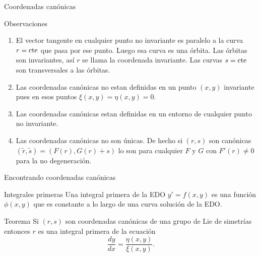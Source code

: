 \documentclass[handout,hyperref={colorlinks=true}]{beamer}
\renewcommand{\emph}[1]{\textcolor[rgb]{1,0,0}{#1}}
\newcommand{\nl}{\onslide<+-> }
\begin{document}
\begin{frame}{Coordenadas canónicas}

\nl \begin{block}{Observaciones}
\begin{enumerate}
\item<+->El vector tangente en cualquier punto no invariante es paralelo a la curva $r=\hbox{cte}$ que pasa por ese punto. Luego esa curva es una órbita. Las órbitas son invariantes, así  $r$ se llama la \emph{coordenada invariante}. Las curvas $s=\hbox{cte}$ son transversales a las órbitas.
\item<+-> Las coordenadas canónicas no estan definidas en un punto $(x,y)$ invariante pues en esos puntos $\xi(x,y)=\eta(x,y)=0$.

\item<+-> Las coordenadas canónicas estan definidas en un entorno de cualquier   punto no invariante.

\item<+-> Las coordenadas canónicas no son únicas. De hecho si $(r,s)$ son canónicas $(\tilde{r},\tilde{s})=(F(r),G(r)+s)$ lo son para cualquier $F$ y $G$ con $F'(r)\neq 0$ para la no degeneración.

\end{enumerate}
\end{block}



\end{frame}


\begin{frame}{Encontrando coordenadas canónicas}

\nl \begin{block}{Integrales primeras}
Una integral primera de la EDO $y'=f(x,y)$ es una función $\phi(x,y)$ que es constante a lo largo de una curva solución de la EDO. 
\end{block}

\nl \begin{block}{Teorema} Si $(r,s)$ son coordenadas canónicas de una grupo de Lie de simetrías entonces $r$ es una integral primera de la ecuación
\begin{equation}\label{eq:int_pri} \frac{dy}{dx}=\frac{\eta(x,y)}{\xi(x,y)}.
\end{equation}
\end{block}


\end{frame}
\end{document}
